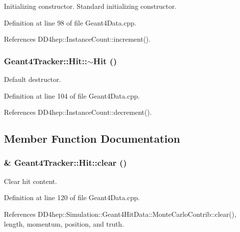 Initializing constructor. Standard initializing constructor. 

Definition at line 98 of file Geant4Data.cpp.

References DD4hep::InstanceCount::increment().\hypertarget{class_d_d4hep_1_1_simulation_1_1_geant4_tracker_1_1_hit_ad443787a7dd9e83a0b93248f823b375d}{
\subsubsection[{$\sim$Hit}]{\setlength{\rightskip}{0pt plus 5cm}Geant4Tracker::Hit::$\sim$Hit ()}}
\label{class_d_d4hep_1_1_simulation_1_1_geant4_tracker_1_1_hit_ad443787a7dd9e83a0b93248f823b375d}


Default destructor. 

Definition at line 104 of file Geant4Data.cpp.

References DD4hep::InstanceCount::decrement().

\subsection{Member Function Documentation}
\hypertarget{class_d_d4hep_1_1_simulation_1_1_geant4_tracker_1_1_hit_aafcd9c0b786c16d9db3de2de661c9200}{
\subsubsection[{clear}]{ \& Geant4Tracker::Hit::clear ()}}
\label{class_d_d4hep_1_1_simulation_1_1_geant4_tracker_1_1_hit_aafcd9c0b786c16d9db3de2de661c9200}


Clear hit content. 

Definition at line 120 of file Geant4Data.cpp.

References DD4hep::Simulation::Geant4HitData::MonteCarloContrib::clear(), length, momentum, position, and truth.

